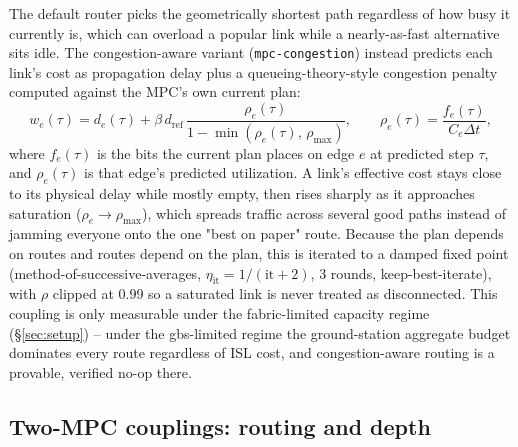 The default router picks the geometrically shortest path regardless of how busy it currently is, which can overload a popular link while a nearly-as-fast alternative sits idle. The congestion-aware variant (\texttt{mpc-congestion}) instead predicts each link's cost as propagation delay plus a queueing-theory-style congestion penalty computed against the MPC's own current plan:
\begin{equation}
w_e(\tau) = d_e(\tau) + \beta\, d_{\mathrm{ref}}\,
  \frac{\rho_e(\tau)}{1 - \min(\rho_e(\tau),\, \rho_{\max})}, \qquad
\rho_e(\tau) = \frac{f_e(\tau)}{C_e \Delta t},
\end{equation}
where $f_e(\tau)$ is the bits the current plan places on edge $e$ at predicted step $\tau$, and $\rho_e(\tau)$ is that edge's predicted utilization. A link's effective cost stays close to its physical delay while mostly empty, then rises sharply as it approaches saturation ($\rho_e \to \rho_{\max}$), which spreads traffic across several good paths instead of jamming everyone onto the one "best on paper" route. Because the plan depends on routes and routes depend on the plan, this is iterated to a damped fixed point (method-of-successive-averages, $\eta_{\mathrm{it}} = 1/(\mathrm{it}+2)$, 3 rounds, keep-best-iterate), with $\rho$ clipped at 0.99 so a saturated link is never treated as disconnected. This coupling is only measurable under the fabric-limited capacity regime (\S\ref{sec:setup}) -- under the gbs-limited regime the ground-station aggregate budget dominates every route regardless of ISL cost, and congestion-aware routing is a provable, verified no-op there.

\subsection{Two-MPC couplings: routing and depth}

